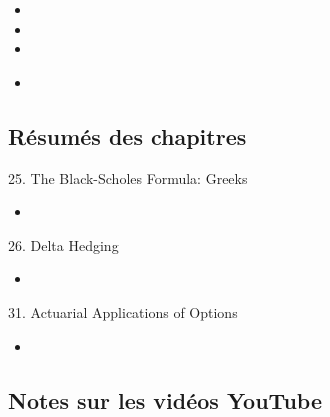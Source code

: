 \begin{ASM_chapter}
\begin{itemize}
	\item	{}
	\item	{}
	\item	{}
\end{itemize}
\end{ASM_chapter}

\begin{YTB_vids}
\begin{itemize}
	\item	
\end{itemize}
\end{YTB_vids}

\subsection{Résumés des chapitres}

\begin{CHPT_SUMM_AUTO}[label = {L.-25}]{25. The Black-Scholes Formula: Greeks}
	\begin{itemize}
		\item	
	\end{itemize}
\end{CHPT_SUMM_AUTO}

\begin{CHPT_SUMM_AUTO}[label = {L.-26}]{26. Delta Hedging}
	\begin{itemize}
		\item	
	\end{itemize}
\end{CHPT_SUMM_AUTO}

\begin{CHPT_SUMM_AUTO}[label = {L.-31}]{31. Actuarial Applications of Options}
	\begin{itemize}
		\item	
	\end{itemize}
\end{CHPT_SUMM_AUTO}

\subsection{Notes sur les vidéos YouTube}

